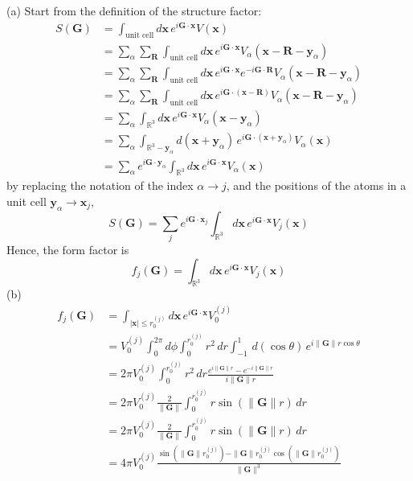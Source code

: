 \documentclass[a4paper,11pt]{article}
\begin{document}
(a)
Start from the definition of the structure factor:
\begin{align}
    S(\mathbf G)
    &=\int_{\text{unit cell}} d\mathbf x\, e^{i\mathbf G\cdot\mathbf x}V(\mathbf x) \\
    &=\sum_{\alpha}\sum_{\mathbf R}\int_{\text{unit cell}} d\mathbf x\, e^{i\mathbf G\cdot\mathbf x}V_\alpha(\mathbf x - \mathbf R-\mathbf y_\alpha) \\
    &=\sum_{\alpha}\sum_{\mathbf R}\int_{\text{unit cell}} d\mathbf x\, e^{i\mathbf G\cdot\mathbf x}e^{-i\mathbf G\cdot\mathbf R}V_\alpha(\mathbf x - \mathbf R-\mathbf y_\alpha) \\
    &=\sum_{\alpha}\sum_{\mathbf R}\int_{\text{unit cell}} d\mathbf x\, e^{i\mathbf G\cdot(\mathbf x-\mathbf R)}V_\alpha(\mathbf x - \mathbf R-\mathbf y_\alpha) \\
    &=\sum_{\alpha}\int_{\mathbb R^3} d\mathbf x\, e^{i\mathbf G\cdot\mathbf x}V_\alpha(\mathbf x-\mathbf y_\alpha) \\
    &=\sum_{\alpha}\int_{\mathbb R^3-\mathbf y_\alpha} d(\mathbf x+\mathbf y_\alpha)\, e^{i\mathbf G\cdot(\mathbf x+\mathbf y_\alpha)}V_\alpha(\mathbf x) \\
    &=\sum_{\alpha}e^{i\mathbf G\cdot\mathbf y_\alpha}\int_{\mathbb R^3} d\mathbf x\, e^{i\mathbf G\cdot\mathbf x}V_\alpha(\mathbf x) 
\end{align}
by replacing the notation of the index $\alpha\rightarrow j$, and the positions of the atoms in a unit cell $\mathbf y_\alpha\rightarrow \mathbf x_j$, 
\begin{equation}
    S(\mathbf G)=\sum_{j}e^{i\mathbf G\cdot\mathbf x_j}\int_{\mathbb R^3} d\mathbf x\, e^{i\mathbf G\cdot\mathbf x}V_j(\mathbf x) 
\end{equation}
Hence, the form factor is
\begin{equation}
    f_j(\mathbf G)=\int_{\mathbb R^3} d\mathbf x\, e^{i\mathbf G\cdot\mathbf x}V_j(\mathbf x) 
\end{equation}
(b) 
\begin{align}
    f_j(\mathbf G)
    &=\int_{|\mathbf x| \le r_0^{(j)}}d\mathbf x\, e^{i\mathbf G\cdot\mathbf x}V_0^{(j)}\\
    &=V_0^{(j)}\int_{0}^{2\pi}d\phi\int_{0}^{r_0^{(j)}}r^2\,dr\int_{-1}^{1} \,d(\cos\theta)\, e^{i\|\mathbf G\|r\cos\theta}\\
    &=2\pi V_0^{(j)}\int_{0}^{r_0^{(j)}}r^2\,dr\frac{e^{i\|\mathbf G\|r}-e^{-i\|\mathbf G\|r}}{i\|\mathbf G\|r}\\
    &=2\pi V_0^{(j)}\frac{2}{\|\mathbf G\|}\int_{0}^{r_0^{(j)}}r\sin(\|\mathbf G\| r)\,dr\\
    &=2\pi V_0^{(j)}\frac{2}{\|\mathbf G\|}\int_{0}^{r_0^{(j)}}r\sin(\|\mathbf G\| r)\,dr\\
    &=4\pi  V_0^{(j)}\frac{\sin(\|\mathbf G\| r_0^{(j)})-\|\mathbf G\| r_0^{(j)}\cos(\|\mathbf G\| r_0^{(j)})}{\|\mathbf G\|^3}
\end{align}
\end{document}
